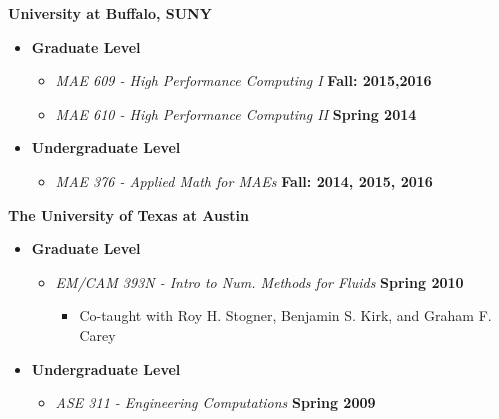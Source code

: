 \textbf{University at Buffalo, SUNY}
\begin{itemize}
\item[] \textbf{Graduate Level}
  \begin{itemize}
  \item[] \textit{MAE 609 - High Performance Computing I} \hfill \textbf{Fall: 2015,2016}
  \item[] \textit{MAE 610 - High Performance Computing II} \hfill \textbf{Spring 2014}
  \end{itemize}
\item[] \textbf{Undergraduate Level}
  \begin{itemize}
  \item[] \textit{MAE 376 - Applied Math for MAEs} \hfill \textbf{Fall: 2014, 2015, 2016}
  \end{itemize}
\end{itemize}

\textbf{The University of Texas at Austin}
\begin{itemize}
\item[] \textbf{Graduate Level}
  \begin{itemize}
  \item[] \textit{EM/CAM 393N - Intro to Num. Methods for Fluids}%
    \hfill \textbf{Spring 2010}
    \begin{itemize}
    \item Co-taught with Roy H. Stogner, Benjamin S. Kirk, and Graham F. Carey
    \end{itemize}
  \end{itemize}
\item[] \textbf{Undergraduate Level}
  \begin{itemize}
  \item[] \textit{ASE 311 - Engineering Computations}%
    \hfill \textbf{Spring 2009}
  \end{itemize}
\end{itemize}
